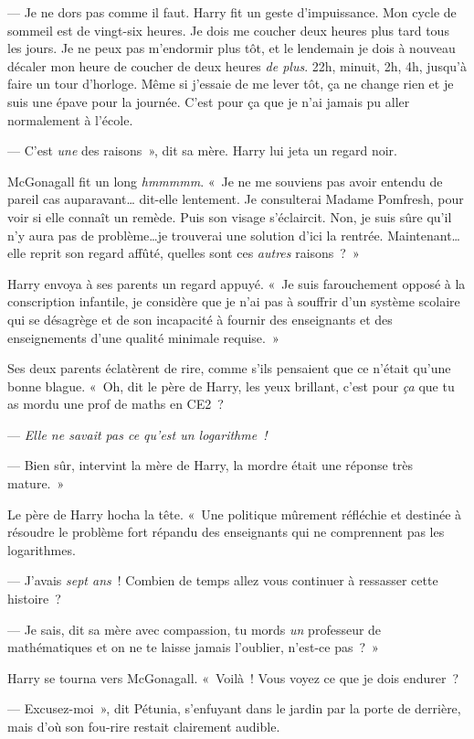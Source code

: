 --- Je ne dors pas comme il faut. Harry fit un geste d'impuissance. Mon cycle de sommeil est de vingt-six heures. Je dois me coucher deux heures plus tard tous les jours. Je ne peux pas m'endormir plus tôt, et le lendemain je dois à nouveau décaler mon heure de coucher de deux heures \emph{de plus}. 22h, minuit, 2h, 4h, jusqu'à faire un tour d'horloge. Même si j'essaie de me lever tôt, ça ne change rien et je suis une épave pour la journée.  C'est pour ça que je n'ai jamais pu aller normalement à l'école.

--- C'est \emph{une} des raisons~», dit sa mère. Harry lui jeta un regard noir.

McGonagall fit un long \emph{hmmmmm}. «~Je ne me souviens pas avoir entendu de pareil cas auparavant… dit-elle lentement. Je consulterai Madame Pomfresh, pour voir si elle connaît un remède. Puis son visage s'éclaircit. Non, je suis sûre qu'il n'y aura pas de problème…je trouverai une solution d'ici la rentrée.  Maintenant… elle reprit son regard affûté, quelles sont ces \emph{autres} raisons~?~»

Harry envoya à ses parents un regard appuyé. «~Je suis farouchement opposé à la conscription infantile, je considère que je n'ai pas à souffrir d'un système scolaire qui se désagrège et de son incapacité à fournir des enseignants et des enseignements d'une qualité minimale requise.~»

Ses deux parents éclatèrent de rire, comme s'ils pensaient que ce n'était qu'une bonne blague. «~Oh, dit le père de Harry, les yeux brillant, c'est pour \emph{ça} que tu as mordu une prof de maths en CE2~?

--- \emph{Elle ne savait pas ce qu'est un logarithme~!~}

--- Bien sûr, intervint la mère de Harry, la mordre était une réponse très mature.~»

Le père de Harry hocha la tête. «~Une politique mûrement réfléchie et destinée à résoudre le problème fort répandu des enseignants qui ne comprennent pas les logarithmes.

--- J'avais \emph{sept ans}~! Combien de temps allez vous continuer à ressasser cette histoire~?

--- Je sais, dit sa mère avec compassion, tu mords \emph{un} professeur de mathématiques et on ne te laisse jamais l'oublier, n'est-ce pas~?~»

Harry se tourna vers McGonagall. «~Voilà~! Vous voyez ce que je dois endurer~?

--- Excusez-moi~», dit Pétunia, s'enfuyant dans le jardin par la porte de derrière, mais d'où son fou-rire restait clairement audible.

